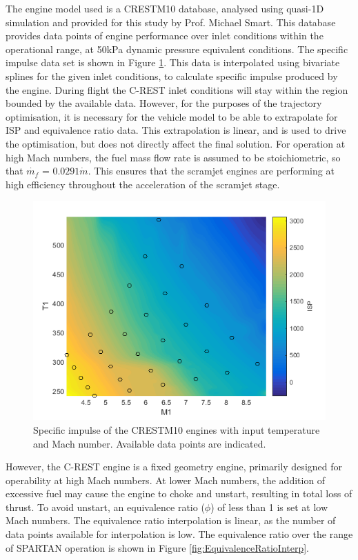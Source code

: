  The engine model used is a CRESTM10 database\cite{Preller2017}, analysed using quasi-1D simulation and provided for this study by Prof. Michael Smart.
This database provides data points of engine performance over inlet conditions within the operational range, at 50kPa dynamic pressure equivalent conditions. The specific impulse data set is shown in Figure \ref{fig:ISPinterp}. This data is interpolated using bivariate splines for the given inlet conditions, to calculate specific impulse produced by the engine. During flight the C-REST inlet conditions will stay within the region bounded by the available data. However, for the purposes of the trajectory optimisation, it is necessary for the vehicle model to be able to extrapolate for ISP and equivalence ratio data. This extrapolation is linear, and is used to drive the optimisation, but does not directly affect the final solution. 
For operation at high Mach numbers, the fuel mass flow rate is assumed to be stoichiometric, so that $\dot{m_f}$ = $0.0291\dot{m}$. This ensures that the scramjet engines are performing at high efficiency throughout the acceleration of the scramjet stage. 
\begin{figure}[ht]
	\centering
	\includegraphics[width=0.6\linewidth]{figures/3_vehicle_design/ISPinterp}
	\caption{Specific impulse of the CRESTM10 engines with input temperature and Mach number. Available data points are indicated.}
	\label{fig:ISPinterp}
\end{figure}
However, the C-REST engine is a fixed geometry engine, primarily designed for operability at high Mach numbers\cite{Preller2017}. At lower Mach numbers, the addition of excessive fuel may cause the engine to choke and unstart, resulting in total loss of thrust\cite{Preller2017}. To avoid unstart, an equivalence ratio ($\phi$) of less than 1 is set at low Mach numbers. The equivalence ratio interpolation is linear, as the number of data points available for interpolation is low. The equivalence ratio over the range of SPARTAN operation is shown in Figure \ref{fig:EquivalenceRatioInterp}.

